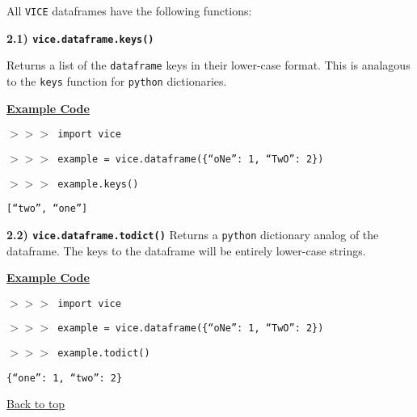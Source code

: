 \documentclass{report}
\begin{document}
\par\null\par\noindent
All \texttt{VICE} dataframes have the following functions: 

\null\par\noindent %
\hypertarget{df:keys}{\textbf{2.1) \texttt{vice.dataframe.keys()}}}
\par\noindent 
Returns a list of the \texttt{dataframe} keys in their lower-case format. This 
is analagous to the \texttt{keys} function for \texttt{python} dictionaries. 
\par\null\par\noindent 
\underline{\textbf{Example Code}} \par\noindent 
\texttt{$>>>$ import vice} \par\noindent 
\texttt{$>>>$ example = vice.dataframe(\{``oNe'': 1, ``TwO'': 2\})} 
\par\noindent 
\texttt{$>>>$ example.keys()} \par\noindent 
\texttt{[``two'', ``one'']} \par\noindent 

\null\par\noindent %
\hypertarget{df:todict}{\textbf{2.2) \texttt{vice.dataframe.todict()}}} 
Returns a \texttt{python} dictionary analog of the dataframe. The keys to the 
dataframe will be entirely lower-case strings. 
\par\null\par\noindent 
\underline{\textbf{Example Code}} \par\noindent 
\texttt{$>>>$ import vice} \par\noindent 
\texttt{$>>>$ example = vice.dataframe(\{``oNe'': 1, ``TwO'': 2\})} 
\par\noindent 
\texttt{$>>>$ example.todict()} \par\noindent 
\texttt{\{``one'': 1, ``two'': 2\}} \par\noindent 

\vfill
\hyperlink{top}{Back to top}
\clearpage 
\end{document}
